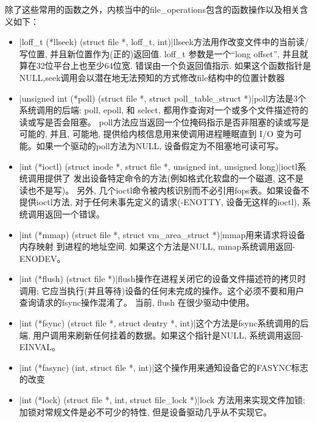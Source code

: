 除了这些常用的函数之外，内核当中的file\_operations包含的函数操作以及相关含义如下：
\begin{itemize}
    \item {}|loff_t (*llseek) (struct file *, loff_t, int)|llseek方法用作改变文件中的当前读/写位置,
        并且新位置作为(正的)返回值.  loff\_t 参数是一个“long offset”,
        并且就算在32位平台上也至少64位宽. 错误由一个负返回值指示.
        如果这个函数指针是NULL,seek调用会以潜在地无法预知的方式修改file结构中的位置计数器
    \item {}|unsigned int (*poll) (struct file *, struct poll_table_struct *)|poll方法是3个系统调用的后端:
        poll, epoll, 和 select, 都用作查询对一个或多个文件描述符的读或写是否会阻塞。
        poll方法应当返回一个位掩码指示是否非阻塞的读或写是可能的, 并且, 可能地,
        提供给内核信息用来使调用进程睡眠直到 I/O 变为可能。如果一个驱动的poll方法为NULL,
        设备假定为不阻塞地可读可写。
    \item {}|int (*ioctl) (struct inode *, struct file *, unsigned int, unsigned long)|ioctl系统调用提供了
        发出设备特定命令的方法(例如格式化软盘的一个磁道, 这不是读也不是写)。
        另外, 几个ioctl命令被内核识别而不必引用fops表。如果设备不提供ioctl方法,
        对于任何未事先定义的请求(-ENOTTY, 设备无这样的ioctl), 系统调用返回一个错误。
    \item {}|int (*mmap) (struct file *, struct vm_area_struct *)|mmap用来请求将设备内存映射
        到进程的地址空间. 如果这个方法是NULL, mmap系统调用返回-ENODEV。
    \item {}|int (*flush) (struct file *)|flush操作在进程关闭它的设备文件描述符的拷贝时调用;
        它应当执行(并且等待)设备的任何未完成的操作。这个必须不要和用户查询请求的fsync操作混淆了。
        当前, flush 在很少驱动中使用。
    \item {}|int (*fsync) (struct file *, struct dentry *, int)|这个方法是fsync系统调用的后端,
        用户调用来刷新任何挂着的数据。如果这个指针是NULL, 系统调用返回-EINVAL。
    \item {}|int (*fasync) (int, struct file *, int)|这个操作用来通知设备它的FASYNC标志的改变
    \item {}|int (*lock) (struct file *, int, struct file_lock *)|lock 方法用来实现文件加锁;
        加锁对常规文件是必不可少的特性, 但是设备驱动几乎从不实现它。
\end{itemize}

